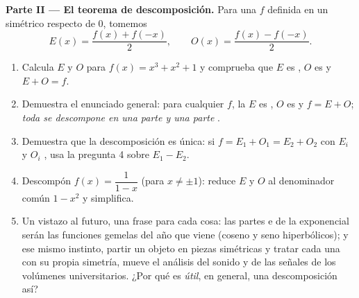 \begin{problem}
\medskip
\noindent\textbf{Parte II --- El teorema de descomposición.}
Para una  $f$ definida en un  simétrico respecto de $0$,
tomemos
\[
E(x) = \frac{f(x) + f(-x)}{2},
\qquad
O(x) = \frac{f(x) - f(-x)}{2} .
\]
\begin{enumerate}[resume]
  \item Calcula $E$ y $O$ para $f(x) = x^3 + x^2 + 1$ y comprueba que $E$
        es , $O$ es  y $E + O = f$.
  \item Demuestra el enunciado general: para cualquier $f$, la  $E$
        es , $O$ es  y $f = E + O$; \emph{toda  se
        descompone en una parte  y una parte }.
  \item Demuestra que la descomposición es única: si
        $f = E_1 + O_1 = E_2 + O_2$ con $E_i$  y $O_i$ , usa la
        pregunta 4 sobre $E_1 - E_2$.
  \item Descompón $f(x) = \dfrac{1}{1 - x}$ (para $x \neq \pm 1$):
        reduce $E$ y $O$ al denominador común $1 - x^2$ y simplifica.
  \item Un vistazo al futuro, una frase para cada cosa: las partes  e
         de la  exponencial serán las funciones gemelas del
        año que viene (coseno y seno hiperbólicos); y ese mismo instinto,
        partir un objeto en piezas simétricas y tratar cada una con su
        propia simetría, mueve el análisis del sonido y de las señales de
        los volúmenes universitarios. ¿Por qué es \emph{útil}, en general,
        una descomposición así?
\end{enumerate}


\end{problem}
